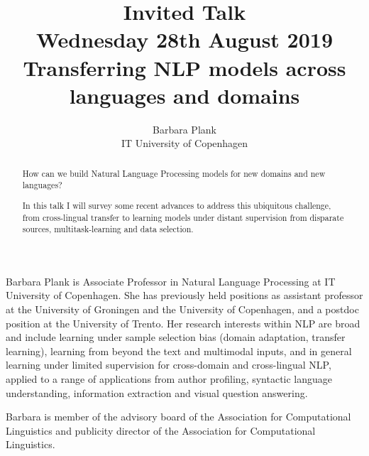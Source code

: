 \documentclass[11pt]{article}
\title{Invited Talk\\
  {\small Wednesday 28th August 2019}\\
  Transferring NLP models across languages and domains}
\author{Barbara Plank\\
  IT University of Copenhagen}
\begin{document}
\maketitle
\begin{abstract}
  How can we build Natural Language Processing models for new domains
  and new languages?

  In this talk I will survey some recent advances to
address this ubiquitous challenge, from cross-lingual transfer to
learning models under distant supervision from disparate sources,
multitask-learning and data selection.
\end{abstract}

\vspace{4mm}
\begin{shortbio}
  Barbara Plank is Associate Professor in Natural Language Processing at
IT University of Copenhagen.
She has previously held positions as assistant professor at the
University of Groningen and the University of
Copenhagen, and a postdoc position at the University of Trento. Her
research interests within NLP are broad and include learning under
sample
selection bias (domain adaptation, transfer learning), learning from
beyond the text and multimodal inputs, and in general learning under
limited supervision
for cross-domain and cross-lingual NLP, applied to a range of
applications from author profiling, syntactic language understanding,
information extraction and visual question answering.

Barbara is
member of the advisory board of the Association for Computational
Linguistics and publicity director of the Association for
Computational Linguistics.
\end{shortbio}
\end{document}
